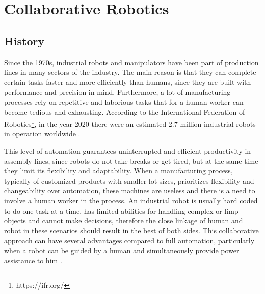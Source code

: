 \chapter{Collaborative Robotics}
\label{chp:2-collab-robots}






\section{History}


\par Since the 1970s, industrial robots and manipulators have been part of production lines in many sectors of the industry. The main reason is that they can complete certain tasks faster and more efficiently than humans, since they are built with performance and precision in mind. Furthermore, a lot of manufacturing processes rely on repetitive and laborious tasks that for a human worker can become tedious and exhausting. According to the International Federation of Robotics\footnote{https://ifr.org/}, in the year 2020 there were an estimated 2.7 million industrial robots in operation worldwide \cite{wr.report.2020}.

\par This level of automation guarantees uninterrupted and efficient productivity in assembly lines, since robots do not take breaks or get tired, but at the same time they limit its flexibility and adaptability. When a manufacturing process, typically of customized products with smaller lot sizes, prioritizes flexibility and changeability over automation, these machines are useless and there is a need to involve a human worker in the process. An industrial robot is usually hard coded to do one task at a time, has limited abilities for handling complex or limp objects and cannot make decisions, therefore the close linkage of human and robot in these scenarios should result in the best of both sides. This collaborative approach can have several advantages compared to full automation, particularly when a robot can be guided by a human and simultaneously provide power assistance to him \cite{coop.assembly}.

